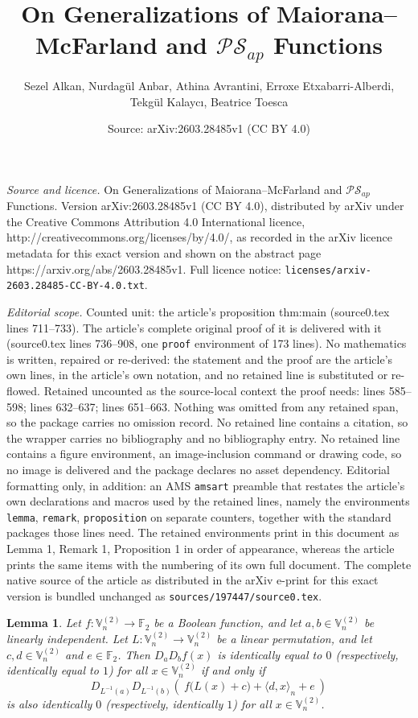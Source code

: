 \documentclass[10pt,a4paper]{amsart}
\title{On Generalizations of Maiorana--McFarland and $\mathcal{PS}_{ap}$ Functions}
\author{Sezel Alkan, Nurdag\"ul Anbar, Athina Avrantini, Erroxe Etxabarri-Alberdi, Tekg\"ul Kalayc{\i}, Beatrice Toesca}
\date{Source: arXiv:2603.28485v1 (CC BY 4.0)}
\newtheorem{lemma}{Lemma}
\newcommand{\F}{\mathbb{F}}
\newcommand{\V}{\mathbb{V}}
\renewcommand{\to}{\rightarrow}
\begin{document}
\maketitle

\noindent\emph{Source and licence.} On Generalizations of Maiorana--McFarland and $\mathcal{PS}_{ap}$ Functions. Version arXiv:2603.28485v1 (CC BY 4.0), distributed by arXiv under the Creative Commons Attribution 4.0 International licence, http://creativecommons.org/licenses/by/4.0/, as recorded in the arXiv licence metadata for this exact version and shown on the abstract page https://arxiv.org/abs/2603.28485v1. Full licence notice: \texttt{licenses/arxiv-2603.28485-CC-BY-4.0.txt}.\par\smallskip

\noindent\textit{Editorial scope.} Counted unit: the article's proposition thm:main (source0.tex lines 711--733). The article's complete original proof of it is delivered with it (source0.tex lines 736--908, one \texttt{proof} environment of 173 lines). No mathematics is written, repaired or re-derived: the statement and the proof are the article's own lines, in the article's own notation, and no retained line is substituted or re-flowed.  Retained uncounted as the source-local context the proof needs: lines 585--598; lines 632--637; lines 651--663.  Nothing was omitted from any retained span, so the package carries no omission record.  No retained line contains a citation, so the wrapper carries no bibliography and no bibliography entry.  No retained line contains a figure environment, an image-inclusion command or drawing code, so no image is delivered and the package declares no asset dependency.  Editorial formatting only, in addition: an AMS \texttt{amsart} preamble that restates the article's own declarations and macros used by the retained lines, namely the environments \texttt{lemma}, \texttt{remark}, \texttt{proposition} on separate counters, together with the standard packages those lines need.  The retained environments print in this document as Lemma 1, Remark 1, Proposition 1 in order of appearance, whereas the article prints the same items with the numbering of its own full document.  The complete native source of the article as distributed in the arXiv e-print for this exact version is bundled unchanged as \texttt{sources/197447/source0.tex}.
	\begin{lemma}\label{lem:second}
		Let \(f \colon \V_n^{(2)} \to \F_2\) be a Boolean function, and let
		\(a,b \in \V_n^{(2)}\) be linearly independent. Let
		\(L \colon \V_n^{(2)} \to \V_n^{(2)}\) be a linear permutation, and let
		\(c,d \in \V_n^{(2)}\) and \(e \in \F_2\).
		Then \(D_a D_b f(x)\) is identically equal to \(0\) (respectively, identically equal to $1$)
		for all \(x \in \V_n^{(2)}\) if and only if
		\begin{equation}\label{eq:second}
			D_{L^{-1}(a)} D_{L^{-1}(b)} \left(\ f\bigl(L(x)+c\bigr)
			+ \langle d,x\rangle_n + e \ \right) 
		\end{equation}
		is also identically \(0\) (respectively, identically \(1\)) for all
		\(x \in \V_n^{(2)}\).
	\end{lemma}
\end{document}
